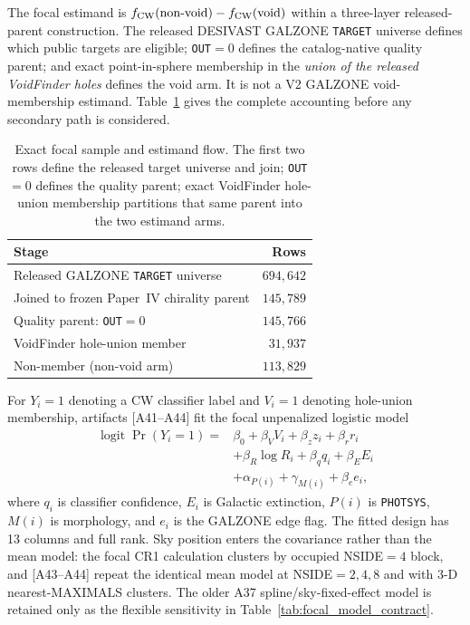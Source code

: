 \documentclass[twocolumn,linenumbers]{aastex702}
\begin{document}
The focal estimand is
$f_{\rm CW}(\mathrm{non\mbox{-}void})-f_{\rm CW}(\mathrm{void})$ within a
three-layer released-parent construction. The released DESIVAST GALZONE
\texttt{TARGET} universe defines which public targets are eligible;
\texttt{OUT}$=0$ defines the catalog-native quality parent; and exact
point-in-sphere membership in the \emph{union of the released VoidFinder
holes} defines the void arm. It is not a V2 GALZONE void-membership
estimand. Table~\ref{tab:focal_flow} gives the complete accounting before
any secondary path is considered.

\begin{table}[!ht]
\caption{Exact focal sample and estimand flow. The first two rows define
the released target universe and join; \texttt{OUT}$=0$ defines the
quality parent; exact VoidFinder hole-union membership partitions that
same parent into the two estimand arms.}
\label{tab:focal_flow}
\begin{ruledtabular}
\begin{tabular}{lr}
Stage & Rows \\
\hline
Released GALZONE \texttt{TARGET} universe & $694{,}642$ \\
Joined to frozen Paper~IV chirality parent & $145{,}789$ \\
Quality parent: \texttt{OUT}$=0$ & $145{,}766$ \\
\quad VoidFinder hole-union member & $31{,}937$ \\
\quad Non-member (non-void arm) & $113{,}829$ \\
\end{tabular}
\end{ruledtabular}
\end{table}

For $Y_i=1$ denoting a CW classifier label and $V_i=1$ denoting
hole-union membership, artifacts [A41--A44] fit the focal unpenalized
logistic model
\begin{align}
\operatorname{logit}\Pr(Y_i=1)={}&\beta_0+\beta_V V_i+\beta_z z_i
 +\beta_r r_i \nonumber\\
 &+\beta_R\log R_i+\beta_q q_i+\beta_E E_i \nonumber\\
 &+\alpha_{P(i)}+\gamma_{M(i)}+\beta_e e_i,
\label{eq:focal_logit}
\end{align}
where $q_i$ is classifier confidence, $E_i$ is Galactic extinction,
$P(i)$ is \texttt{PHOTSYS}, $M(i)$ is morphology, and $e_i$ is the
GALZONE edge flag. The fitted design has 13 columns and full rank.
Sky position enters the covariance rather than the mean model: the focal
CR1 calculation clusters by occupied NSIDE$=4$ block, and [A43--A44]
repeat the identical mean model at NSIDE$=2,4,8$ and with 3-D
nearest-MAXIMALS clusters. The older A37 spline/sky-fixed-effect model
is retained only as the flexible sensitivity in
Table~\ref{tab:focal_model_contract}.
\end{document}

